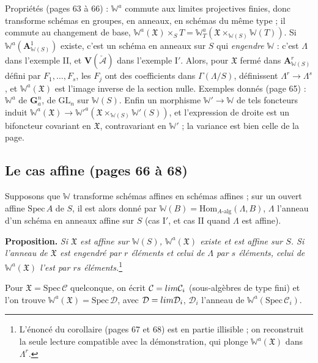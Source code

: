 \documentclass[11pt,a4paper]{article}
\begin{document}
Propriétés (pages 63 à 66) : $\mathbb{W}^{a}$ commute aux limites projectives
finies, donc transforme schémas en groupes, en anneaux, en schémas du même
type ; il commute au changement de base, $\mathbb{W}^{a}(\mathfrak{X}) \times_S T
= \mathbb{W}^{a}_T(\mathfrak{X} \times_{\mathbb{W}(S)} \mathbb{W}(T))$. Si
$\mathbb{W}^{a}(\mathbf{A}^1_{\mathbb{W}(S)})$ existe, c'est un schéma en anneaux
sur $S$ qui \emph{engendre} $\mathbb{W}$ : c'est $\Lambda$ dans l'exemple II, et
$\mathbf{V}(\check{\mathcal{A}})$ dans l'exemple I$'$. Alors, pour $\mathfrak{X}$
fermé dans $\mathbf{A}^r_{\mathbb{W}(S)}$ défini par $F_1, \ldots, F_s$, les $F_j$
ont des coefficients dans $\Gamma(\Lambda/S)$, définissent $\Lambda^r \to
\Lambda^s$, et $\mathbb{W}^{a}(\mathfrak{X})$ est l'image inverse de la section
nulle. Exemples donnés (page 65) : $\mathbb{W}^{a}$ de $\mathbf{G}_a^n$, de
$\mathrm{GL}_n$ sur $\mathbb{W}(S)$. Enfin un morphisme $\mathbb{W}' \to \mathbb{W}$ de tels foncteurs induit
$\mathbb{W}^{a}(\mathfrak{X}) \to \mathbb{W}'^{a}(\mathfrak{X} \times_{\mathbb{W}(S)}
\mathbb{W}'(S))$, et l'expression de droite est un bifoncteur covariant en
$\mathfrak{X}$, contravariant en $\mathbb{W}'$ ; la variance est bien celle de
la page.

\subsection*{Le cas affine (pages 66 à 68)}

Supposons que $\mathbb{W}$ transforme schémas affines en schémas affines ; sur
un ouvert affine $\mathrm{Spec}\,A$ de $S$, il est alors donné par $\mathbb{W}(B)
= \mathrm{Hom}_{A\text{-alg}}(\Lambda, B)$, $\Lambda$ l'anneau d'un schéma en
anneaux affine sur $S$ (cas I$'$, et cas II quand $\Lambda$ est affine).

\textbf{Proposition.} \emph{Si $\mathfrak{X}$ est affine sur $\mathbb{W}(S)$,
$\mathbb{W}^{a}(\mathfrak{X})$ existe et est affine sur $S$. Si l'anneau de
$\mathfrak{X}$ est engendré par $r$ éléments et celui de $\Lambda$ par $s$
éléments, celui de $\mathbb{W}^{a}(\mathfrak{X})$ l'est par $rs$
éléments.}\footnote{L'énoncé du corollaire (pages 67 et 68) est en partie
illisible ; on reconstruit la seule lecture compatible avec la démonstration,
qui plonge $\mathbb{W}^{a}(\mathfrak{X})$ dans $\Lambda^r$.}

Pour $\mathfrak{X} = \mathrm{Spec}\,\mathcal{C}$ quelconque, on écrit $\mathcal{C} =
\varinjlim \mathcal{C}_i$ (sous-algèbres de type fini) et l'on trouve
$\mathbb{W}^{a}(\mathfrak{X}) = \mathrm{Spec}\,\mathcal{D}$, avec $\mathcal{D} =
\varinjlim \mathcal{D}_i$, $\mathcal{D}_i$ l'anneau de
$\mathbb{W}^{a}(\mathrm{Spec}\,\mathcal{C}_i)$.
\end{document}

